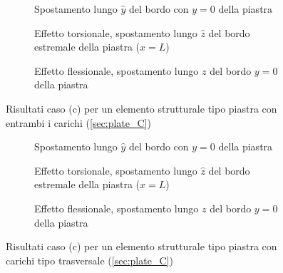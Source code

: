 \documentclass[a4paper,num-refs]{oup-contemporary}
\begin{document}
\begin{figure}[bt!]
	\centering
	
	\begin{subfigure}[t]{0.3\textwidth}
		\centering
		\caption{Spostamento lungo $\hat y$ del bordo con $y=0$ della piastra}
		
	\end{subfigure}
	\hfill
	\begin{subfigure}[t]{0.3\textwidth}
		\centering
		
		\caption{Effetto torsionale, spostamento lungo $\hat z$ del bordo estremale della piastra ($x=L$)}
		
	\end{subfigure}
	\hfill
	\begin{subfigure}[t]{0.3\textwidth}
		\centering
		\caption{Effetto flessionale, spostamento lungo $z$ del bordo $y=0$ della piastra}
		
	\end{subfigure}
	\hfill
	\caption{Risultati caso (c) per un elemento strutturale tipo piastra con entrambi i carichi (\cref{sec:plate_C})}
	\label{fig:plate_C_both_load}
	\centering
	
	\begin{subfigure}[t]{0.3\textwidth}
		\centering
		\caption{Spostamento lungo $\hat y$ del bordo con $y=0$ della piastra}
		
	\end{subfigure}
	\hfill
	\begin{subfigure}[t]{0.3\textwidth}
		\centering
		
		\caption{Effetto torsionale, spostamento lungo $\hat z$ del bordo estremale della piastra ($x=L$)}
		
	\end{subfigure}
	\hfill
	\begin{subfigure}[t]{0.3\textwidth}
		\centering
		\caption{Effetto flessionale, spostamento lungo $z$ del bordo $y=0$ della piastra}
		
	\end{subfigure}
	\hfill
	\caption{Risultati caso (c) per un elemento strutturale tipo piastra con carichi tipo trasversale (\cref{sec:plate_C})}
	\label{fig:plate_C_transload_load}


\end{figure}
\end{document}
